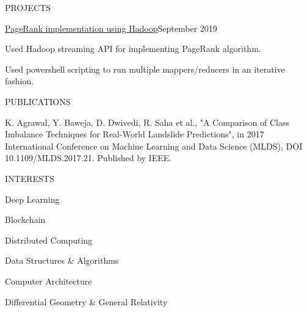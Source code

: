 \documentclass{resume} %
\begin{document}
\begin{rSection}{PROJECTS}
\begin{rSubsection}{\href{https://github.com/ritzvik/PageRank}{PageRank implementation using Hadoop}}{September 2019}{}{}
\item Used Hadoop streaming API for implementing PageRank algorithm.
\item Used powershell scripting to run multiple mappers/reducers in an iterative fashion.
\end{rSubsection}

\end{rSection}




\begin{rSection}{PUBLICATIONS} 

\item K. Agrawal, Y. Baweja, D. Dwivedi, R. Saha et
al., "A Comparison of Class Imbalance Techniques
for Real-World Landslide Predictions",
in 2017 International Conference on Machine
Learning and Data Science (MLDS), DOI
10.1109/MLDS.2017.21. Published by IEEE.

\end{rSection}



\begin{rSection}{INTERESTS}
\item Deep Learning
\item Blockchain
\item Distributed Computing
\item Data Structures \& Algorithms
\item Computer Architecture
\item Differential Geometry \& General Relativity
\end{rSection}
\end{document}
